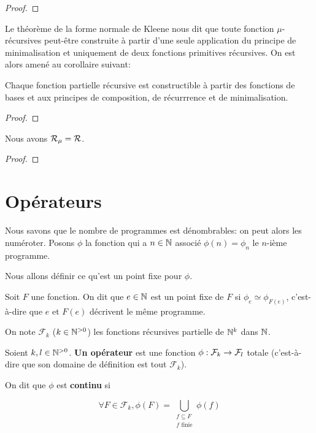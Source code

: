 \ifdefined\outputproof
\begin{proof}

\end{proof}
\fi

Le théorème de la forme normale de Kleene nous dit que toute fonction
$\mu$-récursives peut-être construite à partir d'une seule application du
principe de minimalisation et uniquement de deux fonctions primitives
récursives. On est alors amené au corollaire suivant:

\begin{corollary}
	Chaque fonction partielle récursive est constructible à partir des fonctions de bases
	et aux principes de composition, de récurrrence et de minimalisation.
\end{corollary}

\ifdefined\outputproof
\begin{proof}

\end{proof}
\fi

\begin{theorem}
	Nous avons $\mathcal{R}_{\mu} = \mathcal{R}$.
\end{theorem}

\ifdefined\outputproof
\begin{proof}

\end{proof}
\fi

\section{Opérateurs}

Nous savons que le nombre de programmes est dénombrables: on peut alors les
numéroter. Posons $\phi$ la fonction qui a $n \in \mathbb{N}$ associé $\phi(n) =
\phi_{n}$ le $n$-ième programme.

Nous allons définir ce qu'est un point fixe pour $\phi$.


\begin{definition}
	Soit $F$ une fonction. On dit que $e \in \mathbb{N}$ est un point fixe de $F$
	si $\phi_{e} \simeq \phi_{F(e)}$, c'est-à-dire que $e$ et $F(e)$ décrivent
	le même programme.
\end{definition}

On note $\mathcal{F}_{k}$ ($k \in \mathbb{N}^{> 0}$) les fonctions récursives
partielle de $\mathbb{N}^{k}$ dans $\mathbb{N}$.

\begin{definition}
	Soient $k, l \in \mathbb{N}^{> 0}$.
	\textbf{Un opérateur} est une fonction
	$\phi : \mathcal{F}_{k} \rightarrow \mathcal{F}_{l}$ totale (c'est-à-dire que son domaine de définition est tout
	$\mathcal{F}_{k}$).

	On dit que $\phi$ est \textbf{continu} si

	\begin{equation*}
		\forall F \in \mathcal{F}_{k}, \phi(F) = \displaystyle \bigcup_{\substack{f \subseteq
			F \\ f \text{ finie}}} \phi(f)
	\end{equation*}
\end{definition}

